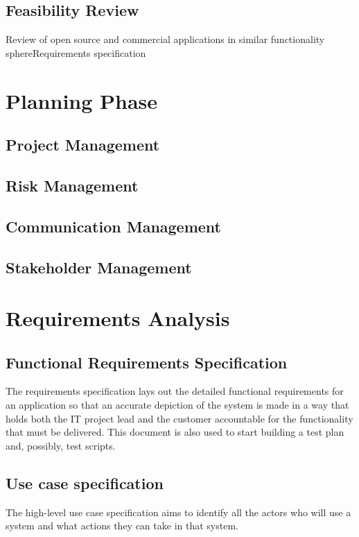 \documentclass[a4paper]{article}
\begin{document}
\subsection {Feasibility Review}
Review of open source and commercial applications in similar functionality sphereRequirements specification

\section {Planning Phase}

\subsection {Project Management}
\subsection {Risk Management}
\subsection {Communication Management}
\subsection {Stakeholder Management}
\section {Requirements Analysis}

\subsection {Functional Requirements Specification}

The requirements specification lays out the detailed functional requirements for an application so that an
accurate depiction of the system is made in a way that holds both the IT project lead and the customer accountable for the functionality that must be delivered.  This document is also used to start building a test plan and, possibly, test scripts.

\subsection {Use case specification}
The high-level use case specification aims to identify all the actors who will use a system and what
actions they can take in that system.
\end{document}
